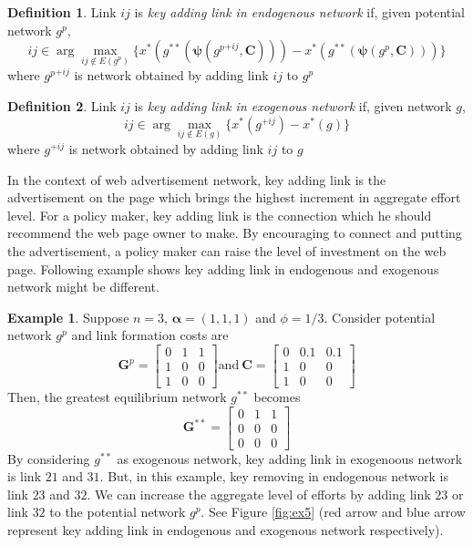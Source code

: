\documentclass[12pt]{article}
\theoremstyle{definition}
\newtheorem{definition}{Definition}
\newtheorem{example}{Example}
\newcommand{\bm}[1]{\boldsymbol{#1}}
\begin{document}
\begin{definition}
	Link $ij$ is {\it{key adding link in endogenous network}} if, given potential network $g^p$,
    \[ ij \in \arg \max_{ij \notin E(g^p)} \{ x^*(g^{**}(\bm{\psi}({g^p}^{+ij}, \bm{C}))) - x^*(g^{**}(\bm{\psi}(g^p, \bm{C}))) \} \]
    where ${g^p}^{+ij}$ is network obtained by adding link $ij$ to $g^p$
\end{definition}

\begin{definition}
	Link $ij$ is {\it{key adding link in exogenous network}} if, given network $g$,
    \[ ij \in \arg \max_{ij \notin E(g)} \{ x^*(g^{+ij}) - x^*(g) \} \]
    where $g^{+ij}$ is network obtained by adding link $ij$ to $g$
\end{definition}

In the context of web advertisement network, key adding link is the advertisement on the page which brings the highest increment in aggregate effort level.
For a policy maker, key adding link is the connection which he should recommend the web page owner to make.
By encouraging to connect and putting the advertisement, a policy maker can raise the level of investment on the web page.
Following example shows key adding link in endogenous and exogenous network might be different.

\begin{example}
Suppose $n=3$, $\bm{\alpha} = (1,1,1)$ and $\phi = 1/3$.
Consider potential network $g^p$ and link formation costs are
\[
\bm{G}^p = \left[
            \begin{array}{ccc}
                0 & 1 & 1 \\
                1 & 0 & 0 \\
                1 & 0 & 0
            \end{array} \right]
\text{and} \ 
\bm{C} = \left[
                \begin{array}{ccc}
                    0 & 0.1 & 0.1 \\
                    1 & 0 & 0 \\
                    1 & 0 & 0
                \end{array} \right] \]
Then, the greatest equilibrium network $g^{**}$ becomes
\[ \bm{G}^{**} = \left[
    \begin{array}{ccc}
        0 & 1 & 1 \\
        0 & 0 & 0 \\
        0 & 0 & 0
    \end{array} \right]\]
By considering $g^{**}$ as exogenous network, key adding link in exogenoous network is link $21$ and $31$.
But, in this example, key removing in endogenous network is link $23$ and $32$.
We can increase the aggregate level of efforts by adding link $23$ or link $32$ to the potential network $g^p$.
See Figure \ref{fig:ex5} (red arrow and blue arrow represent key adding link in endogenous and exogenous network respectively).
\end{example}
\end{document}
